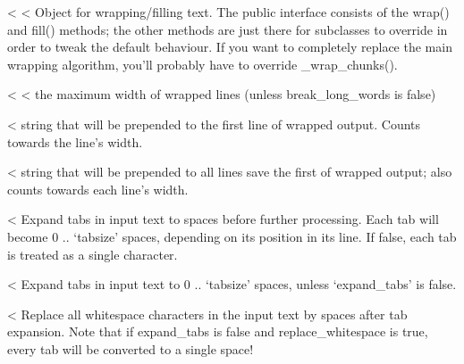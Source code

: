 \documentclass[letterpaper,10pt,english]{sphinxmanual}
\begin{document}
\begin{savenotes}
\begin{savenotes}
\begin{savenotes}
\begin{savenotes}
\begin{fulllineitems}
{{<%
<%
Object for wrapping/filling text.  The public interface consists of
the wrap() and fill() methods; the other methods are just there for
subclasses to override in order to tweak the default behaviour.
If you want to completely replace the main wrapping algorithm,
you’ll probably have to override \_wrap\_chunks().
\begin{description}
<%
<%
the maximum width of wrapped lines (unless break\_long\_words
is false)

<%
string that will be prepended to the first line of wrapped
output.  Counts towards the line’s width.

<%
string that will be prepended to all lines save the first
of wrapped output; also counts towards each line’s width.

<%
Expand tabs in input text to spaces before further processing.
Each tab will become 0 .. ‘tabsize’ spaces, depending on its position
in its line.  If false, each tab is treated as a single character.

<%
Expand tabs in input text to 0 .. ‘tabsize’ spaces, unless
‘expand\_tabs’ is false.

<%
Replace all whitespace characters in the input text by spaces
after tab expansion.  Note that if expand\_tabs is false and
replace\_whitespace is true, every tab will be converted to a
single space!


\end{description}}}
\end{fulllineitems}
\end{savenotes}
\end{savenotes}
\end{savenotes}
\end{savenotes}
\end{document}
